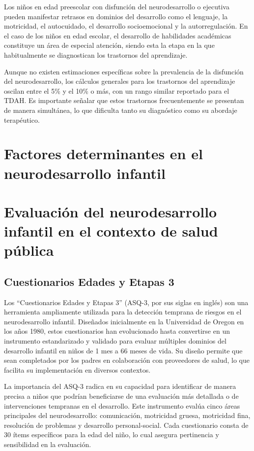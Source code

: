 \documentclass[11pt,letterpaper]{report}
\begin{document}
Los niños en edad preescolar con disfunción del neurodesarrollo o ejecutiva 
pueden manifestar retrasos en dominios del desarrollo como el lenguaje, la 
motricidad, el autocuidado, el desarrollo socioemocional y la autorregulación. 
En el caso de los niños en edad escolar, el desarrollo de habilidades
académicas constituye un área de especial atención, siendo esta la etapa en la
que  habitualmente se diagnostican los trastornos del aprendizaje.
\cite{Nelson49}

Aunque no existen estimaciones específicas sobre la prevalencia de la
disfunción del neurodesarrollo, los cálculos generales para los trastornos del
aprendizaje oscilan entre el 5\% y el 10\% o más, con un rango similar
reportado para el TDAH. Es importante señalar que estos trastornos
frecuentemente se presentan de manera simultánea, lo que dificulta tanto su
diagnóstico como su abordaje terapéutico.

\section{Factores determinantes en el neurodesarrollo infantil}

\section{Evaluación del neurodesarrollo infantil en el contexto de salud pública}

\subsection{Cuestionarios Edades y Etapas 3}
Los ``Cuestionarios Edades y Etapas 3'' (ASQ-3, por sus siglas en inglés) son
una herramienta ampliamente utilizada para la detección temprana de riesgos en
el neurodesarrollo infantil. Diseñados inicialmente en la Universidad de Oregon
en los años 1980, estos cuestionarios han evolucionado hasta convertirse en un
instrumento estandarizado y validado para evaluar múltiples dominios del
desarrollo infantil en niños de 1 mes a 66 meses de vida. Su diseño permite que
sean completados por los padres en colaboración con proveedores de salud, lo
que facilita su implementación en diversos contextos.
\cite{Singh2017, ASQ4decades}

La importancia del ASQ-3 radica en su capacidad para identificar de manera
precisa a niños que podrían beneficiarse de una evaluación más detallada o de
intervenciones tempranas en el desarrollo. Este instrumento evalúa cinco áreas
principales del neurodesarrollo: comunicación, motricidad gruesa, motricidad
fina, resolución de problemas y desarrollo personal-social. Cada cuestionario
consta de 30 ítems específicos para la edad del niño, lo cual asegura
pertinencia y sensibilidad en la evaluación. \cite{squires2009ages}
\end{document}
